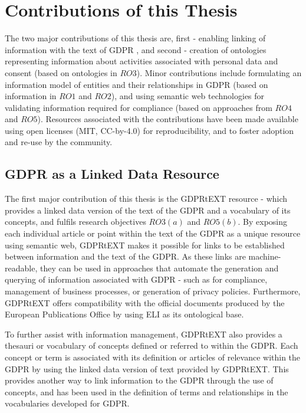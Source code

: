 \section{Contributions of this Thesis}\label{sec:intro-contributions}
The two major contributions of this thesis are, first - enabling linking of information with the text of GDPR , and second - creation of ontologies representing information about activities associated with personal data and consent (based on ontologies in $RO3$). Minor contributions include formulating an information model of entities and their relationships in GDPR (based on information in $RO1$ and $RO2$), and using semantic web technologies for validating information required for compliance (based on approaches from $RO4$ and $RO5$). Resources associated with the contributions have been made available using open licenses (MIT,  CC-by-4.0) for reproducibility, and to foster adoption and re-use by the community.

\subsection{GDPR as a Linked Data Resource}
The first major contribution of this thesis is the GDPRtEXT resource - which provides a linked data version of the text of the GDPR and a vocabulary of its concepts, and fulfils research objectives $RO3(a)$ and $RO5(b)$. By exposing each individual article or point within the text of the GDPR as a unique resource using semantic web, GDPRtEXT makes it possible for links to be established between information and the text of the GDPR. As these links are machine-readable, they can be used in approaches that automate the generation and querying of information associated with GDPR - such as for compliance, management of business processes, or generation of privacy policies. Furthermore, GDPRtEXT offers compatibility with the official documents produced by the European Publications Office by using ELI as its ontological base.

To further assist with information management, GDPRtEXT also provides a thesauri or vocabulary of concepts defined or referred to within the GDPR. Each concept or term is associated with its definition or articles of relevance within the GDPR by using the linked data version of text provided by GDPRtEXT. This provides another way to link information to the GDPR through the use of concepts, and has been used in the definition of terms and relationships in the vocabularies developed for GDPR.

